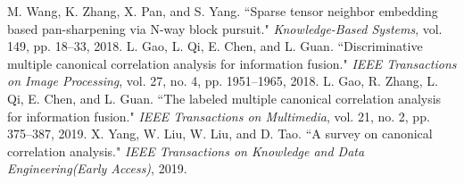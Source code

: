 \documentclass[journal]{IEEEtran}
\begin{document}
\begin{thebibliography}{1}
M. Wang, K. Zhang, X. Pan, and S. Yang. ``Sparse tensor neighbor embedding based pan-sharpening via N-way block pursuit." \emph{Knowledge-Based Systems}, vol. 149, pp. 18--33, 2018.
L. Gao, L. Qi, E. Chen, and L. Guan. ``Discriminative multiple canonical correlation analysis for information fusion." \emph{IEEE Transactions on Image Processing}, vol. 27, no. 4, pp. 1951--1965, 2018.
L. Gao, R. Zhang, L. Qi, E. Chen, and L. Guan. ``The labeled multiple canonical correlation analysis for information fusion." \emph{IEEE Transactions on Multimedia}, vol. 21, no. 2, pp. 375--387, 2019.
X. Yang, W. Liu, W. Liu, and D. Tao. ``A survey on canonical correlation analysis." \emph{IEEE Transactions on Knowledge and Data Engineering(Early Access)}, 2019.

\end{thebibliography}

%










\end{document}
